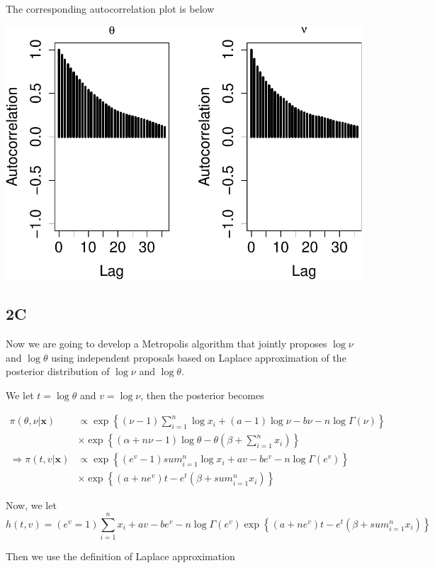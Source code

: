 \documentclass[]{article}
\begin{document}
The corresponding autocorrelation plot is below

\includegraphics{AMS206b_H4_files/figure-latex/unnamed-chunk-23-1.pdf}

\subsection{2C}\label{c}

Now we are going to develop a Metropolis algorithm that jointly proposes
\(\log\nu\) and \(\log\theta\) using independent proposals based on
Laplace approximation of the posterior distribution of \(\log\nu\) and
\(\log\theta\).

We let \(t=\log\theta\) and \(v =\log\nu\), then the posterior becomes

\begin{align*} 
\pi(\theta,\nu|\pmb{x}) &\propto \exp\left\{(\nu -1) \sum_{i=1}^n \log x_i +(a -1)\log\nu - b\nu -n\log\Gamma(\nu) \right\}\\
&\times \exp\left\{(\alpha +n\nu-1)\log\theta -\theta\left(\beta + \sum_{i=1}^n x_i \right)\right\}\\
\Rightarrow \pi(t,v|\pmb{x}) &\propto \exp\left\{(e^v -1) sum_{i=1}^n \log x_i + av - be^v -n\log \Gamma(e^v)\right\}\\
&\times \exp\left\{(a +ne^v)t - e^t\left(\beta + sum_{i=1}^n x_i\right) \right\}
\end{align*}

Now, we let
\[h(t,v) = (e^v =1)\sum_{i=1}^n x_i + av -be^v-n\log \Gamma(e^v)\exp\left\{(a +ne^v)t - e^t\left(\beta + sum_{i=1}^n x_i\right) \right\}\]

Then we use the definition of Laplace approximation
\end{document}

